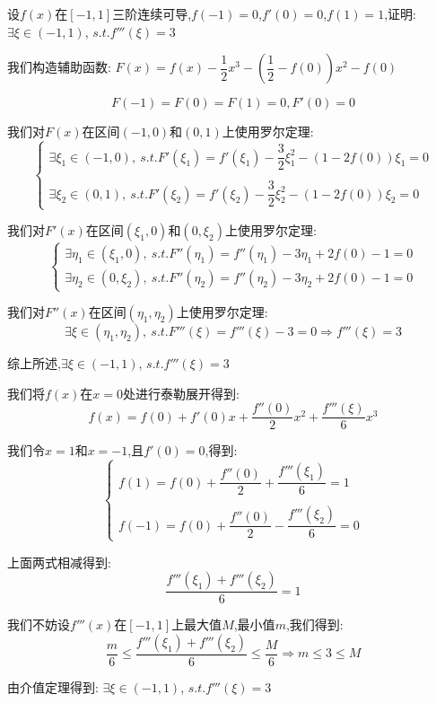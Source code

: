 
\begin{proposition}
	设$f(x)$在$[-1,1]$三阶连续可导,$f(-1)=0$,$f'(0)=0$,$f(1)=1$,证明: $\exists \xi\in(-1,1)$, $s.t. f'''(\xi)=3$
\end{proposition}
\begin{solution}

	我们构造辅助函数:  $F(x)=f(x)-\dfrac{1}{2}x^3-\left( \dfrac{1}{2}-f(0)\right) x^2-f(0)$

	$$F(-1)=F(0)=F(1)=0,F'(0)=0$$

	我们对$F(x)$在区间$(-1,0)$和$(0,1)$上使用罗尔定理:
	$$\left\lbrace
		\begin{array}{l}
			\exists \xi_{1}\in(-1,0),\ s.t. F'(\xi_{1})=f'(\xi_{1})-\dfrac{3}{2}\xi_{1}^2-\left( 1-2f(0)\right)\xi_{1}=0 \\
			\\
			\exists \xi_{2}\in(0,1),\ s.t. F'(\xi_{2})=f'(\xi_{2})-\dfrac{3}{2}\xi_{2}^2-\left( 1-2f(0)\right)\xi_{2}=0
		\end{array}
		\right. $$

	我们对$F'(x)$在区间$(\xi_{1},0)$和$(0,\xi_{2})$上使用罗尔定理:
	$$\left\lbrace
		\begin{array}{l}
			\exists \eta_{1}\in(\xi_{1},0),\ s.t. F''(\eta_{1})=f''(\eta_{1})-3\eta_{1}+2f(0)-1=0 \\
			\exists \eta_{2}\in(0,\xi_{2}),\ s.t. F''(\eta_{2})=f''(\eta_{2})-3\eta_{2}+2f(0)-1=0
		\end{array}
		\right. $$

	我们对$F''(x)$在区间$(\eta_{1},\eta_{2})$上使用罗尔定理:
	$$\exists \xi\in(\eta_{1},\eta_{2}),\ s.t. F'''(\xi)=f'''(\xi)-3=0\Rightarrow f'''(\xi)=3$$

	综上所述,$\exists \xi\in(-1,1)$, $s.t. f'''(\xi)=3$
\end{solution}
\begin{anymark}[注: 泰勒展开]
	我们将$f(x)$在$x=0$处进行泰勒展开得到:
	$$f(x)=f(0)+f'(0)x+\dfrac{f''(0)}{2}x^2+\dfrac{f'''(\xi)}{6}x^3$$

	我们令$x=1$和$x=-1$,且$f'(0)=0$,得到:
	$$\left\lbrace
		\begin{array}{l}
			f(1)=f(0)+\dfrac{f''(0)}{2}+\dfrac{f'''(\xi_{1})}{6}=1 \\
			\\
			f(-1)=f(0)+\dfrac{f''(0)}{2}-\dfrac{f'''(\xi_{2})}{6}=0
		\end{array}
		\right. $$

	上面两式相减得到:
	$$\dfrac{f'''(\xi_{1})+f'''(\xi_{2})}{6}=1$$

	我们不妨设$f'''(x)$在$[-1,1]$上最大值$M$,最小值$m$,我们得到:
	$$\dfrac{m}{6}\leq\dfrac{f'''(\xi_{1})+f'''(\xi_{2})}{6}\leq \dfrac{M}{6}\Rightarrow m\leq 3\leq M$$

	由介值定理得到: $\exists \xi\in(-1,1)$, $s.t. f'''(\xi)=3$
\end{anymark}

